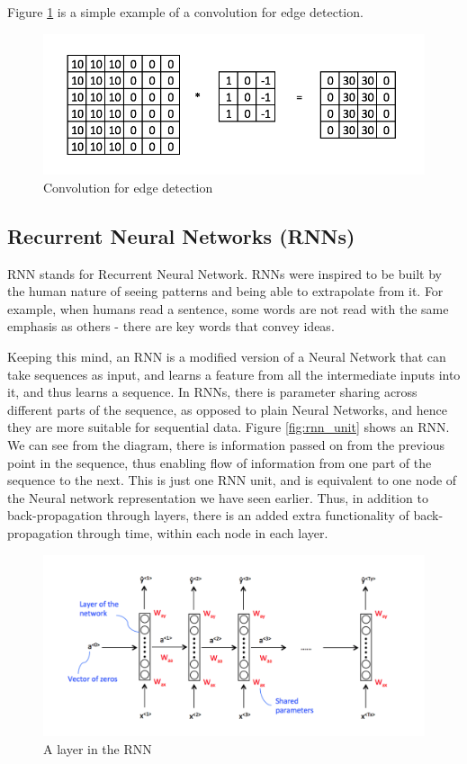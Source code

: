 Figure \ref{fig:convolution_edge_detection} is a simple example of a convolution for edge detection. 




\begin{figure}
    \centering
    \includegraphics[height=0.15\paperheight]{Figures/cnn_edge_detection.png}
    \caption{Convolution for edge detection}
    \label{fig:convolution_edge_detection}
\end{figure}
\subsection{Recurrent Neural Networks (RNNs)}

RNN stands for Recurrent Neural Network. 
RNNs were inspired to be built by the human nature of seeing patterns and being able to extrapolate from it. For example, when humans read a sentence, some words are not read with the same emphasis as others - there are key words that convey ideas.

Keeping this mind, an RNN is a modified version of a Neural Network that can take sequences as input, and learns a feature from all the intermediate inputs into it, and thus learns a sequence. In RNNs, there is parameter sharing across different parts of the sequence, as opposed to plain Neural Networks, and hence they are more suitable for sequential data. Figure \ref{fig:rnn_unit} shows an RNN. We can see from the diagram, there is information passed on from the previous point in the sequence, thus enabling flow of information from one part of the sequence to the next. This is just one RNN unit, and is equivalent to one node of the Neural network representation we have seen earlier. Thus, in addition to back-propagation through layers, there is an added extra functionality of back-propagation through time, within each node in each layer.

\begin{figure}
    \centering
    \includegraphics[height=0.2\paperheight]{Figures/rnn_simple.png}
    \caption{A layer in the RNN\cite{cavaioni_deeplearning_2018}}
    \label{fig:rnn_cell}
\end{figure}

